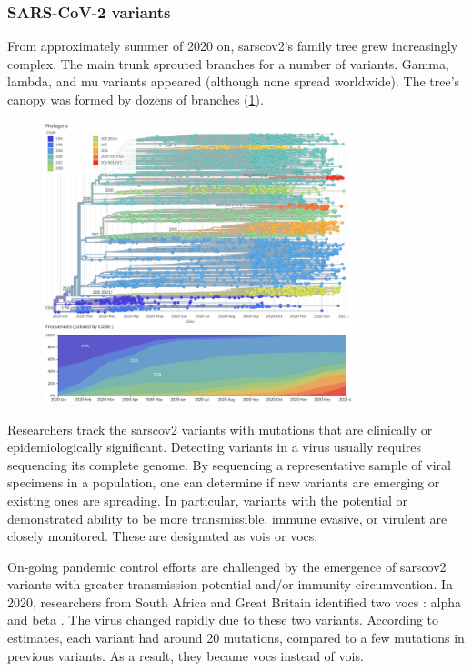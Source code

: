         \subsubsection{SARS-CoV-2 variants}
        From approximately summer of 2020 on, \acrshort{sarscov2}'s family tree grew increasingly complex. The main trunk sprouted branches for a number of variants. Gamma, lambda, and mu variants appeared (although none spread worldwide). The tree's canopy was formed by dozens of branches (\cref{fig:intro:nextstrain}).
        \begin{figure}[ht!]
        	\centering
        	\includegraphics[width=0.8\textwidth]{figures/intro/nextstrain-global.png}
        	\label{fig:intro:nextstrain}
        \end{figure}
        Researchers track the \acrshort{sarscov2} variants with mutations that are clinically or epidemiologically significant. Detecting variants in a virus usually requires sequencing its complete genome. By sequencing a representative sample of viral specimens in a population, one can determine if new variants are emerging or existing ones are spreading. In particular, variants with the potential or demonstrated ability to be more transmissible, immune evasive, or virulent are closely monitored. These are designated as \acrfull{vois} or \acrfull{vocs}.
        
        On-going pandemic control efforts are challenged by the emergence of \acrshort{sarscov2} variants with greater transmission potential and/or immunity circumvention. In 2020, researchers from South Africa and Great Britain identified two \acrlong{vocs} \cite{voc2022}: alpha and beta \cite{planas2021}. The virus changed rapidly due to these two variants. According to estimates, each variant had around 20 mutations, compared to a few mutations in previous variants. As a result, they became \acrshort{vocs} instead of \acrshort{vois}.
        
